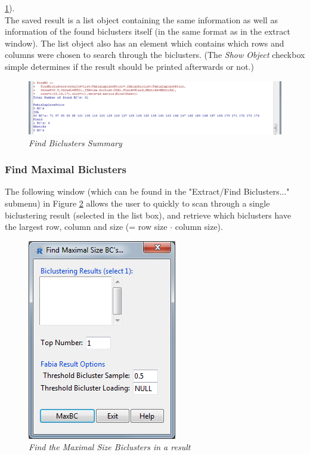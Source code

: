 \documentclass[a4paper]{article}\usepackage[]{graphicx}\usepackage[]{color}
\begin{document}
\ref{findwindow_example1}).
\\
The saved result is a list object containing the same information as well as
information of the found biclusters itself (in the same format as in the extract
window). The list object also has an element which contains which rows and
columns were chosen to search through the biclusters.
(The {\it Show Object} checkbox simple determines if the result should be
printed afterwards or not.)
\begin{figure}[H]
\centering
\includegraphics[scale=0.4]{figures/findwindow_example1.png}
\caption{{\it Find Biclusters Summary}\label{findwindow_example1}}
\end{figure}


\subsubsection{Find Maximal Biclusters}

The following window (which can be found in the "Extract/Find Biclusters..." submenu) in Figure \ref{maxbc} allows the user to quickly to scan through a single biclustering result (selected in the list box), and retrieve which biclusters have the largest row, column and size (= row size $\cdot$ column size). 

\begin{figure}[H]
\centering
\includegraphics[scale=0.4]{figures/MaxBC.png}
\caption{{\it Find the Maximal Size Biclusters in a result}\label{maxbc}}
\end{figure}
\end{document}
